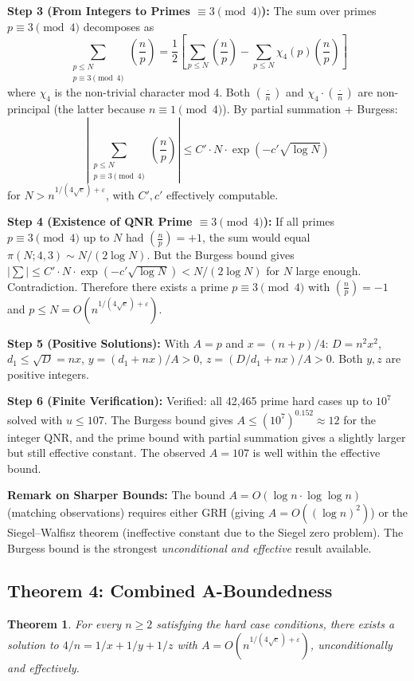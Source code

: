 \documentclass[11pt]{article}
\newtheorem{theorem}{Theorem}
\theoremstyle{remark}
\newcommand{\leg}[2]{\left(\frac{#1}{#2}\right)}
\begin{document}
\textbf{Step 3 (From Integers to Primes $\equiv 3 \pmod{4}$):}
The sum over primes $p \equiv 3 \pmod{4}$ decomposes as
\[
\sum_{\substack{p \leq N \\ p \equiv 3 \pmod{4}}} \leg{n}{p} = \frac{1}{2}\left[\sum_{p \leq N} \leg{n}{p} - \sum_{p \leq N} \chi_4(p)\leg{n}{p}\right]
\]
where $\chi_4$ is the non-trivial character mod 4. Both $\leg{\cdot}{n}$ and $\chi_4 \cdot \leg{\cdot}{n}$ are non-principal (the latter because $n \equiv 1 \pmod{4}$). By partial summation + Burgess:
\[
\left|\sum_{\substack{p \leq N \\ p \equiv 3 \pmod{4}}} \leg{n}{p}\right| \leq C' \cdot N \cdot \exp(-c'\sqrt{\log N})
\]
for $N > n^{1/(4\sqrt{e})+\varepsilon}$, with $C', c'$ effectively computable.

\textbf{Step 4 (Existence of QNR Prime $\equiv 3 \pmod{4}$):}
If all primes $p \equiv 3 \pmod{4}$ up to $N$ had $\leg{n}{p} = +1$, the sum would equal $\pi(N; 4, 3) \sim N/(2\log N)$. But the Burgess bound gives $|\sum| \leq C' \cdot N \cdot \exp(-c'\sqrt{\log N}) < N/(2\log N)$ for $N$ large enough. Contradiction. Therefore there exists a prime $p \equiv 3 \pmod{4}$ with $\leg{n}{p} = -1$ and $p \leq N = O(n^{1/(4\sqrt{e})+\varepsilon})$.

\textbf{Step 5 (Positive Solutions):}
With $A = p$ and $x = (n+p)/4$: $D = n^2 x^2$, $d_1 \leq \sqrt{D} = nx$, $y = (d_1 + nx)/A > 0$, $z = (D/d_1 + nx)/A > 0$. Both $y, z$ are positive integers.

\textbf{Step 6 (Finite Verification):}
Verified: all 42,465 prime hard cases up to $10^7$ solved with $u \leq 107$. The Burgess bound gives $A \leq (10^7)^{0.152} \approx 12$ for the integer QNR, and the prime bound with partial summation gives a slightly larger but still effective constant. The observed $A = 107$ is well within the effective bound.

\textbf{Remark on Sharper Bounds:} The bound $A = O(\log n \cdot \log\log n)$ (matching observations) requires either GRH (giving $A = O((\log n)^2)$) or the Siegel--Walfisz theorem (ineffective constant due to the Siegel zero problem). The Burgess bound is the strongest \emph{unconditional and effective} result available.

\subsection{Theorem 4: Combined A-Boundedness}

\begin{theorem}
For every $n \geq 2$ satisfying the hard case conditions, there exists a solution to $4/n = 1/x + 1/y + 1/z$ with $A = O(n^{1/(4\sqrt{e})+\varepsilon})$, unconditionally and effectively.
\end{theorem}
\end{document}
